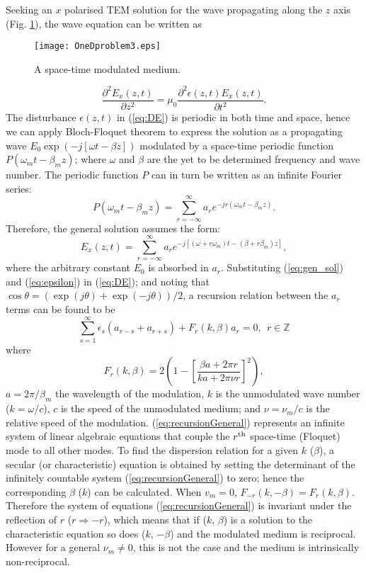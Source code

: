 \documentclass[journal]{IEEEtran}
\begin{document}
Seeking an $x$ polarised TEM solution for the wave propagating along the $z$ axis (Fig. \ref{fig:OneDProblem}), the wave equation can be written as
\begin{figure}
\centering
\texttt{[image: OneDproblem3.eps]}
\caption{A  space-time modulated medium.}
\label{fig:OneDProblem}
\end{figure}
\begin{equation}
\label{eq:DE}
\frac{\partial^2 E_x(z,t)}{\partial z^2}=\mu_0\frac{\partial^2 \epsilon(z,t)E_x(z,t)}{\partial t^2}.
\end{equation}
The disturbance $\epsilon(z,t)$ in (\ref{eq:DE}) is periodic in both time and space, hence we can apply Bloch-Floquet theorem to express the solution as a propagating wave $E_0\exp(-j[\omega t-\beta z])$ modulated by a space-time periodic function $P(\omega_m t-\beta_m z)$; where $\omega$ and $\beta$ are the yet to be determined frequency and wave number. The periodic function $P$ can  in turn be written as an infinite Fourier series:
\begin{equation}
P(\omega_m t-\beta_m z)=\sum_{r=-\infty}^\infty a_r e^{-jr(\omega_m t-\beta_m z)}.
\end{equation}
Therefore, the general solution assumes the form:
\begin{equation}
\label{eq:gen_sol}
E_x(z,t)=\sum_{r=-\infty}^\infty a_r e^{-j[(\omega+r\omega_m) t-(\beta+r\beta_m) z]},
\end{equation}
where the arbitrary constant $E_0$ is absorbed in $a_r$.
Substituting (\ref{eq:gen_sol}) and (\ref{eq:epsilon}) in (\ref{eq:DE}); and noting that $\cos\theta=(\exp(j\theta)+\exp(-j\theta))/2$, a recursion relation between the $a_r$ terms can be found to be 
\begin{equation}
\label{eq:recursionGeneral}
\sum_{s=1}^{\infty}\epsilon_s\left(a_{r-s}+a_{r+s}\right)+F_r(k,\beta)a_r=0,~~r\in \mathbb{Z}
\end{equation}
where 
\begin{equation}
\label{eq:F}
F_r(k,\beta)=2\left(1-\left[\frac{\beta a+2\pi r}{ka+2\pi\nu r}\right]^2\right),
\end{equation}
$a=2\pi/\beta_m$ the wavelength of the modulation, $k$ is the unmodulated wave number ($k=\omega/c$), $c$ is the speed of the unmodulated medium; and $\nu=\nu_m/c$ is the relative speed of the modulation. (\ref{eq:recursionGeneral}) represents an infinite system of linear algebraic equations that couple the $r^\textnormal{th}$ space-time (Floquet) mode to all other modes. To find the dispersion relation for a given $k$ ($\beta$), a secular (or characteristic) equation is obtained by setting the determinant of the infinitely countable system (\ref{eq:recursionGeneral}) to zero; hence the corresponding $\beta$ ($k$) can be calculated. When $v_m=0$, $F_{-r}(k,-\beta)=F_r(k,\beta)$. Therefore the system of equations (\ref{eq:recursionGeneral}) is invariant under the reflection of $r$ ($r\Rightarrow -r$), which means that if ($k$, $\beta$) is a solution to the characteristic equation so does ($k$, $-\beta$) and the modulated medium is reciprocal. However for a general $\nu_m\neq 0$, this is not the case and the medium is intrinsically non-reciprocal.
\end{document}
